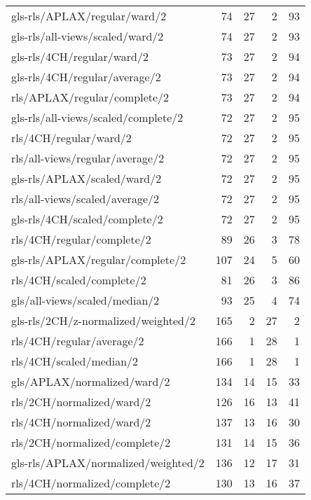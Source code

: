 \begin{longtable}{lrrrr}
    gls-rls/APLAX/regular/ward/2              &  74 & 27 &  2 & 93 \\
    gls-rls/all-views/scaled/ward/2           &  74 & 27 &  2 & 93 \\
    gls-rls/4CH/regular/ward/2                &  73 & 27 &  2 & 94 \\
    gls-rls/4CH/regular/average/2             &  73 & 27 &  2 & 94 \\
    rls/APLAX/regular/complete/2              &  73 & 27 &  2 & 94 \\
    gls-rls/all-views/scaled/complete/2       &  72 & 27 &  2 & 95 \\
    rls/4CH/regular/ward/2                    &  72 & 27 &  2 & 95 \\
    rls/all-views/regular/average/2           &  72 & 27 &  2 & 95 \\
    gls-rls/APLAX/scaled/ward/2               &  72 & 27 &  2 & 95 \\
    rls/all-views/scaled/average/2            &  72 & 27 &  2 & 95 \\
    gls-rls/4CH/scaled/complete/2             &  72 & 27 &  2 & 95 \\
    rls/4CH/regular/complete/2                &  89 & 26 &  3 & 78 \\
    gls-rls/APLAX/regular/complete/2          & 107 & 24 &  5 & 60 \\
    rls/4CH/scaled/complete/2                 &  81 & 26 &  3 & 86 \\
    gls/all-views/scaled/median/2             &  93 & 25 &  4 & 74 \\
    gls-rls/2CH/z-normalized/weighted/2       & 165 &  2 & 27 &  2 \\
    rls/4CH/regular/average/2                 & 166 &  1 & 28 &  1 \\
    rls/4CH/scaled/median/2                   & 166 &  1 & 28 &  1 \\
    gls/APLAX/normalized/ward/2               & 134 & 14 & 15 & 33 \\
    rls/2CH/normalized/ward/2                 & 126 & 16 & 13 & 41 \\
    rls/4CH/normalized/ward/2                 & 137 & 13 & 16 & 30 \\
    rls/2CH/normalized/complete/2             & 131 & 14 & 15 & 36 \\
    gls-rls/APLAX/normalized/weighted/2       & 136 & 12 & 17 & 31 \\
    rls/4CH/normalized/complete/2             & 130 & 13 & 16 & 37 \\

\end{longtable}

